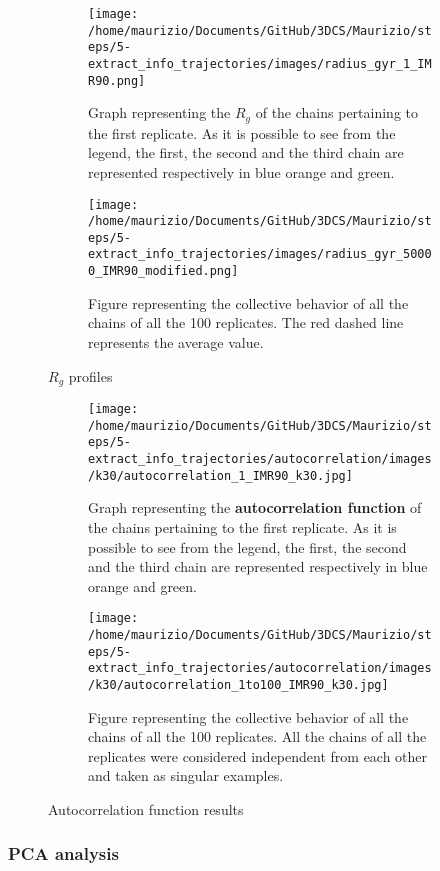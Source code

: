 \begin{figure}[H]
    \centering
    
    \begin{subfigure}{0.49\textwidth}
      \texttt{[image: /home/maurizio/Documents/GitHub/3DCS/Maurizio/steps/5-extract\_info\_trajectories/images/radius\_gyr\_1\_IMR90.png]}
      \caption{Graph representing the $R_g$ of the chains pertaining to the first replicate. As it is possible to see from the legend, the first, the second and the third chain are represented respectively in blue orange and green.}
      \label{fig:RG first replicate}
    \end{subfigure}
    \hfill
    \begin{subfigure}{0.49\textwidth}
      \texttt{[image: /home/maurizio/Documents/GitHub/3DCS/Maurizio/steps/5-extract\_info\_trajectories/images/radius\_gyr\_50000\_IMR90\_modified.png]}
      \caption{Figure representing the collective behavior of all the chains of all the 100 replicates. The red dashed line represents the average value.}
      \label{fig:RG collective replicates}
    \end{subfigure}
  
    \caption{$R_g$ profiles}
    \label{fig:RG figures}
\end{figure}

\begin{figure}[H]
    \centering
    
    \begin{subfigure}{0.80\textwidth}
      \texttt{[image: /home/maurizio/Documents/GitHub/3DCS/Maurizio/steps/5-extract\_info\_trajectories/autocorrelation/images/k30/autocorrelation\_1\_IMR90\_k30.jpg]}
      \caption{Graph representing the \textbf{autocorrelation function }of the chains pertaining to the first replicate. As it is possible to see from the legend, the first, the second and the third chain are represented respectively in blue orange and green.}
      \label{fig:autocorrelation function first replicate}
    \end{subfigure}
    \hfill
    \begin{subfigure}{0.80\textwidth}
      \texttt{[image: /home/maurizio/Documents/GitHub/3DCS/Maurizio/steps/5-extract\_info\_trajectories/autocorrelation/images/k30/autocorrelation\_1to100\_IMR90\_k30.jpg]}
      \caption{Figure representing the collective behavior of all the chains of all the 100 replicates. All the chains of all the replicates were considered independent from each other and taken as singular examples.}
      \label{fig:autocorrelation function collective replicates}
    \end{subfigure}
    \caption{Autocorrelation function results}
  \end{figure}

\subsubsection{PCA analysis}
